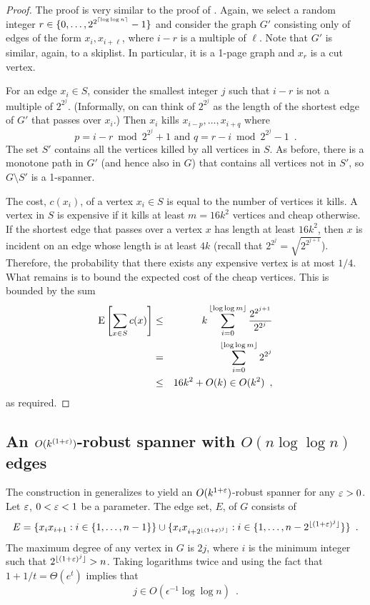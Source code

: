 \documentclass{patmorin}
\begin{document}
\begin{proof}
The proof is very similar to the proof of .
Again, we select a random integer $r\in\{0,\ldots,2^{2^{{\lceil \log\log
n \rceil}}}-1\}$ and consider the graph $G'$ consisting only of edges of the
form $x_i,x_{i+\ell}$, where $i-r$ is a multiple of $\ell$.  Note that
$G'$ is similar, again, to a skiplist.  In particular, it is a 1-page
graph and $x_r$ is a cut vertex.

For an edge $x_i\in S$, consider the smallest integer $j$ such that
$i-r$ is not a multiple of $2^{2^{j}}$.  (Informally, on can think
of $2^{2^{j}}$ as the length of the shortest edge of $G'$ that passes
over $x_i$.)  Then $x_i$ kills $x_{i-p},\ldots,x_{i+q}$ where
\[
   p= i-r \bmod 2^{2^j}+1 \text{ and } 
   q= r-i \bmod 2^{2^j}-1 \enspace .
\]
The set $S'$ contains all the vertices killed by all vertices in $S$.
As before, there is a monotone path in $G'$ (and hence also in $G$)
that contains all vertices not in $S'$, so $G\setminus S'$ is a 1-spanner.

The cost, $c(x_i)$, of a vertex $x_i\in S$ is equal to the number
of vertices it kills.  A vertex in $S$ is expensive if it kills at
least $m=16k^{2}$ vertices and cheap otherwise.  If the shortest edge
that passes over a vertex $x$ has length at least $16k^2$, then $x$
is incident on an edge whose length is at least $4k$ (recall that
$2^{2^j}=\sqrt{2^{2^{j+1}}}$).  Therefore, the probability that there
exists any expensive vertex is at most $1/4$.  What remains is to bound
the expected cost of the cheap vertices.  This is bounded by the sum
\begin{eqnarray*}
  \mathrm{E}\left[\sum_{x\in S} c(x)\right] 
    & \le & k\sum_{i=0}^{\lfloor\log\log m\rfloor}\frac{2^{2^{j+1}}}{2^{2^{j}}} \\  
    & = & \sum_{i=0}^{\lfloor \log\log m \rfloor}2^{2^j} \\
    & \le & 16k^2 + O(k) \in O(k^2) \enspace ,
\end{eqnarray*}
as required.
\end{proof}

\subsection{An $O(k^{(1+\varepsilon)})$-robust spanner with $O(n\log\log n)$ edges}

The construction in  generalizes to yield an
$O(k^{1+\varepsilon})$-robust spanner for any $\varepsilon>0$.  Let $\varepsilon$, $0<\varepsilon<1$
be a parameter.  The edge set, $E$, of $G$ consists of
\[
  E =  \{x_ix_{i+1} : i\in\{1,\ldots,n-1\}\} 
      \cup \{x_ix_{i+2^{{\lfloor (1+\varepsilon)^j \rfloor}}} : 
               i\in\{1,\ldots,n-2^{{\lfloor (1+\varepsilon)^j \rfloor}}\} \} \\
    \enspace .
\]
The maximum degree of any vertex in $G$ is $2j$, where $i$ is the minimum
integer such that $2^{{\lfloor (1+\varepsilon)^j \rfloor}} > n$.  Taking logarithms twice
and using the fact that $1+1/t = \Theta(e^t)$ implies that
\[
    j \in O(\epsilon^{-1}\log\log n) \enspace .
\]
\end{document}
